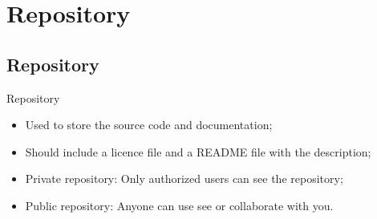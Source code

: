 \section{Repository}
\subsection{Repository}
\begin{frame}{Repository}
    \begin{itemize}
        \item Used to store the source code and documentation;
        \item Should include a licence file and a README file with the description;
        \item Private repository: Only authorized users can see the repository;
        \item Public repository: Anyone can use see or collaborate with you.      
    \end{itemize}
\end{frame}
